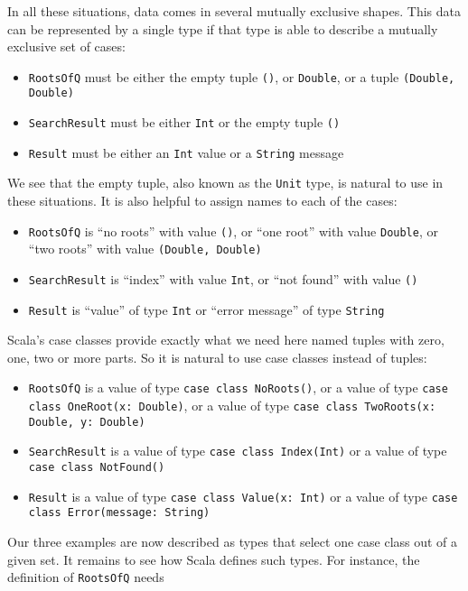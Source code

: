 In all these situations, data comes in several mutually exclusive
shapes. This data can be represented by a single type if that type
is able to describe a mutually exclusive set of cases:
\begin{itemize}
\item \lstinline!RootsOfQ! must be either the empty tuple \lstinline!()!,
or \lstinline!Double!, or a tuple \lstinline!(Double, Double)!
\item \lstinline!SearchResult! must be either \lstinline!Int! or the empty
tuple \lstinline!()!
\item \lstinline!Result! must be either an \lstinline!Int! value or a
\lstinline!String! message
\end{itemize}
We see that the empty tuple, also known as the \lstinline!Unit! type,
is natural to use in these situations. It is also helpful to assign
names to each of the cases:
\begin{itemize}
\item \lstinline!RootsOfQ! is ``no roots'' with value \lstinline!()!,
or ``one root'' with value \lstinline!Double!, or ``two roots''
with value \lstinline!(Double, Double)!
\item \lstinline!SearchResult! is ``index'' with value \lstinline!Int!,
or ``not found'' with value \lstinline!()!
\item \lstinline!Result! is ``value'' of type \lstinline!Int! or ``error
message'' of type \lstinline!String!
\end{itemize}
Scala's case classes provide exactly what we need here \textemdash{}
named tuples with zero, one, two or more parts. So it is natural to
use case classes instead of tuples:
\begin{itemize}
\item \lstinline!RootsOfQ! is a value of type \lstinline!case class NoRoots()!,
or a value of type \lstinline!case class OneRoot(x: Double)!, or
a value of type \lstinline!case class TwoRoots(x: Double, y: Double)!
\item \lstinline!SearchResult! is a value of type \lstinline!case class Index(Int)!
or a value of type \lstinline!case class NotFound()!
\item \lstinline!Result! is a value of type \lstinline!case class Value(x: Int)!
or a value of type \lstinline!case class Error(message: String)!
\end{itemize}
Our three examples are now described as types that select one case
class out of a given set. It remains to see how Scala defines such
types. For instance, the definition of \lstinline!RootsOfQ! needs
